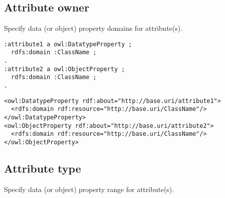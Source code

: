 \subsection{Attribute owner}

\begin{trule}
	\label{rule:attribute-rc-domain}
	Specify data (or object) property domains for attribute(s).
\end{trule}

\vspace{-\parskip}
\begin{minipage}[b]{.385\textwidth}
\begin{lstlisting}[language=Turtle, caption={Domain specification in Turtle syntax}, captionpos=b]
:attribute1 a owl:DatatypeProperty ;
  rdfs:domain :ClassName ;
.
:attribute2 a owl:ObjectProperty ;
  rdfs:domain :ClassName ;
.
\end{lstlisting}
\end{minipage}%
\quad
\vspace{-\parskip}
\begin{minipage}[b]{.5\textwidth}
\begin{lstlisting}[language=RDF/XML, caption={Domain specification in  RDF/XML syntax}, captionpos=b]
<owl:DatatypeProperty rdf:about="http://base.uri/attribute1">
  <rdfs:domain rdf:resource="http://base.uri/ClassName"/>
</owl:DatatypeProperty>  
<owl:ObjectProperty rdf:about="http://base.uri/attribute2">
  <rdfs:domain rdf:resource="http://base.uri/ClassName"/>
</owl:ObjectProperty>
\end{lstlisting}
\end{minipage}
\vspace{-\parskip}

\subsection{Attribute type}

\begin{trule}
	\label{rule:attribute-rc-range}
	Specify data (or object) property range for attribute(s).
\end{trule}

